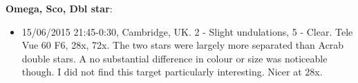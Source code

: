 {\bf Omega, Sco, Dbl star}:
\begin{itemize}
\item 15/06/2015 21:45-0:30, Cambridge, UK. 2 - Slight undulations, 5 - Clear. Tele Vue 60 F6, 28x, 72x. The two stars were largely more separated than Acrab double stars. A no substantial difference in colour or size was noticeable though. I did not find this target particularly interesting. Nicer at 28x.
\end{itemize}
